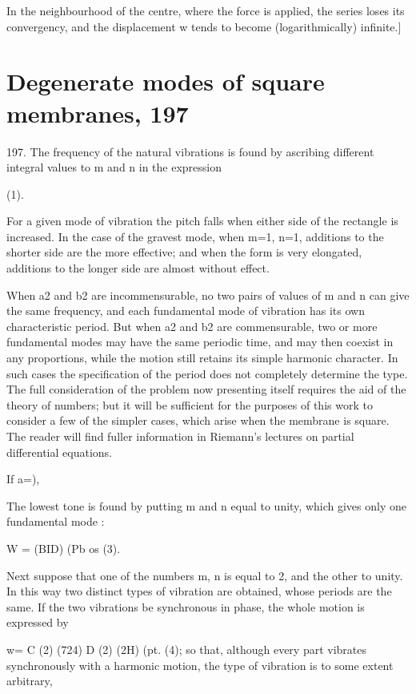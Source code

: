 In the neighbourhood of the centre, where the force is applied,
the series loses its convergency, and the displacement w tends to
become (logarithmically) infinite.]

\setcounter{equation}{0}
\section{Degenerate modes of square membranes, 197}

197. The frequency of the natural vibrations is found by ascribing
different integral values to m and n in the expression

(1).

For a given mode of vibration the pitch falls when either side of the
rectangle is increased. In the case of the gravest mode, when m=1, n=1,
additions to the shorter side are the more effective; and when the form
is very elongated, additions to the longer side are almost without
effect.

When a2 and b2 are incommensurable, no two pairs of values of m and n
can give the same frequency, and each fundamental mode of vibration has
its own characteristic period. But when a2 and b2 are commensurable, two
or more fundamental modes may have the same periodic time, and may then
coexist in any proportions, while the motion still retains its simple
harmonic character. In such cases the specification of the period does
not completely determine the type. The full consideration of the problem
now presenting itself requires the aid of the theory of numbers; but it
will be sufficient for the purposes of this work to consider a few of
the simpler cases, which arise when the membrane is square. The reader
will find fuller information in Riemann's lectures on partial
differential equations.

If a=),

The lowest tone is found by putting m and n equal to unity, which gives
only one fundamental mode :

W = (BID) (Pb os (3).

Next suppose that one of the numbers m, n is equal to 2, and the other
to unity. In this way two distinct types of vibration are obtained,
whose periods are the same. If the two vibrations be synchronous in
phase, the whole motion is expressed by

w= C (2) (724) D (2) (2H) (pt. (4);
so that, although every part vibrates synchronously with a harmonic
motion, the type of vibration is to some extent arbitrary,

